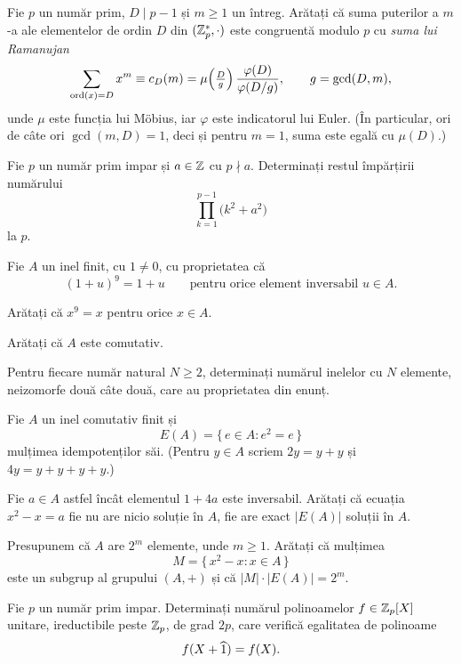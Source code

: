 \begin{problema}
Fie $p$ un număr prim, $D \mid p-1$ și $m \ge 1$ un întreg. Arătați că suma puterilor a $m$-a ale elementelor de ordin $D$ din $(\mathbb{Z}_p^*,\cdot)$ este congruentă modulo $p$ cu \emph{suma lui Ramanujan}
\[
  \sum_{\operatorname{ord}(x)=D} x^m \equiv c_D(m) = \mu\!\left(\tfrac{D}{g}\right)\frac{\varphi(D)}{\varphi(D/g)},
  \qquad g = \gcd(D,m),
\]
unde $\mu$ este funcția lui Möbius, iar $\varphi$ este indicatorul lui Euler. (În particular, ori de câte ori $\gcd(m,D)=1$, deci și pentru $m=1$, suma este egală cu $\mu(D)$.)
\end{problema}

\begin{problema}
Fie $p$ un număr prim impar și $a \in \mathbb{Z}$ cu $p \nmid a$. Determinați restul împărțirii numărului
\[
  \prod_{k=1}^{p-1}\bigl(k^2 + a^2\bigr)
\]
la $p$.
\end{problema}

\begin{problema}
Fie $A$ un inel finit, cu $1\neq 0$, cu proprietatea că
\[
  (1+u)^{9}=1+u\qquad\text{pentru orice element inversabil } u\in A .
\]
\begin{parti}
\item Arătați că $x^{9}=x$ pentru orice $x\in A$.
\item Arătați că $A$ este comutativ.
\item Pentru fiecare număr natural $N\ge 2$, determinați numărul inelelor cu $N$ elemente, neizomorfe două câte două, care au proprietatea din enunț.
\end{parti}
\end{problema}

\begin{problema}
Fie $A$ un inel comutativ finit și
\[
  E(A)=\{\,e\in A : e^{2}=e\,\}
\]
mulțimea idempotenților săi. (Pentru $y\in A$ scriem $2y=y+y$ și $4y=y+y+y+y$.)
\begin{parti}
\item Fie $a\in A$ astfel încât elementul $1+4a$ este inversabil. Arătați că
  ecuația $x^{2}-x=a$ fie nu are nicio soluție în $A$, fie are exact $|E(A)|$
  soluții în $A$.
\item Presupunem că $A$ are $2^{m}$ elemente, unde $m\ge1$. Arătați că mulțimea
  \[
    M=\{\,x^{2}-x : x\in A\,\}
  \]
  este un subgrup al grupului $(A,+)$ și că $|M|\cdot|E(A)|=2^{m}$.
\end{parti}
\end{problema}

\begin{problema}
Fie $p$ un număr prim impar. Determinați numărul polinoamelor $f\in\mathbb{Z}_p[X]$ unitare, ireductibile peste $\mathbb{Z}_p$, de grad $2p$, care verifică egalitatea de polinoame
\[
  f(X+\widehat{1})=f(X).
\]
\end{problema}

